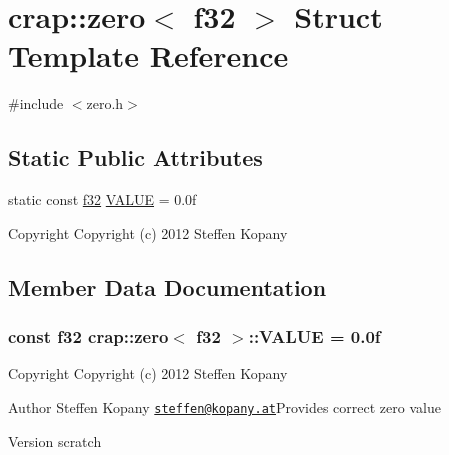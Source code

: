 \hypertarget{structcrap_1_1zero_3_01f32_01_4}{\section{crap\-:\-:zero$<$ f32 $>$ Struct Template Reference}
\label{structcrap_1_1zero_3_01f32_01_4}
}


{\ttfamily \#include $<$zero.\-h$>$}

\subsection*{Static Public Attributes}
\begin{DoxyCompactItemize}
\item 
static const \hyperlink{types_8h_a154db6eda6a99565cb060a1da4b4c930}{f32} \hyperlink{structcrap_1_1zero_3_01f32_01_4_a8f273005ab22247cb70022adac98953e}{V\-A\-L\-U\-E} = 0.\-0f
\begin{DoxyCompactList}\small\item\em \begin{DoxyCopyright}{Copyright}
Copyright (c) 2012 Steffen Kopany 
\end{DoxyCopyright}
\end{DoxyCompactList}\end{DoxyCompactItemize}


\subsection{Member Data Documentation}
\hypertarget{structcrap_1_1zero_3_01f32_01_4_a8f273005ab22247cb70022adac98953e}{
\subsubsection[{V\-A\-L\-U\-E}]{\setlength{\rightskip}{0pt plus 5cm}const {\bf f32} {\bf crap\-::zero}$<$ {\bf f32} $>$\-::V\-A\-L\-U\-E = 0.\-0f\hspace{0.3cm}{\ttfamily [static]}}}\label{structcrap_1_1zero_3_01f32_01_4_a8f273005ab22247cb70022adac98953e}


\begin{DoxyCopyright}{Copyright}
Copyright (c) 2012 Steffen Kopany 
\end{DoxyCopyright}


\begin{DoxyAuthor}{Author}
Steffen Kopany \href{mailto:steffen@kopany.at}{\tt steffen@kopany.\-at}Provides correct zero value 
\end{DoxyAuthor}
\begin{DoxyVersion}{Version}
scratch 
\end{DoxyVersion}


